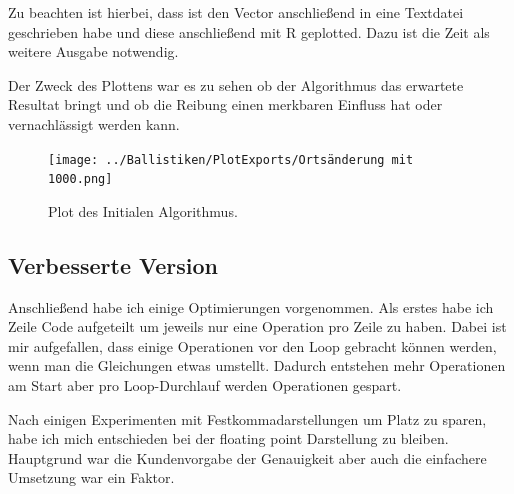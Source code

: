 \documentclass{article}
\begin{document}
    \newpage

    Zu beachten ist hierbei, dass ist den Vector anschließend in eine Textdatei geschrieben habe und diese anschließend
    mit R geplotted. Dazu ist die Zeit als weitere Ausgabe notwendig.

    Der Zweck des Plottens war es zu sehen ob der Algorithmus das erwartete Resultat bringt und ob die Reibung einen
    merkbaren Einfluss hat oder vernachlässigt werden kann.



    \begin{figure}[!htbp]
        \texttt{[image: ../Ballistiken/PlotExports/Ortsänderung mit 1000.png]}
        \caption{Plot des Initialen Algorithmus.}
        \label{Ortsplot initial}
    \end{figure}


    \subsection{Verbesserte Version}

    Anschließend habe ich einige Optimierungen vorgenommen.
    Als erstes habe ich Zeile Code aufgeteilt um jeweils nur eine Operation pro Zeile zu haben.
    Dabei ist mir aufgefallen, dass einige Operationen vor den Loop gebracht können werden, wenn man die Gleichungen
    etwas umstellt. Dadurch entstehen mehr Operationen am Start aber pro Loop-Durchlauf werden Operationen
    gespart.

    \newblock

    Nach einigen Experimenten mit Festkommadarstellungen um Platz zu sparen, habe ich mich entschieden bei der floating
    point Darstellung zu bleiben. Hauptgrund war die Kundenvorgabe der Genauigkeit aber auch die einfachere Umsetzung
    war ein Faktor.

    \newpage
\end{document}
